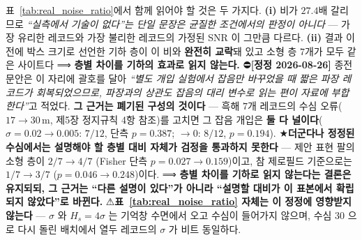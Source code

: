 \documentclass[11pt]{report}
\numberwithin{equation}{chapter}
\numberwithin{figure}{chapter}
\numberwithin{table}{chapter}
\begin{document}
표~\ref{tab:real_noise_ratio}에서 함께 읽어야 할 것은 두 가지다. \textbf{(i)} 비가 $27.4$배
갈리므로 \emph{``실측에서 기술이 없다''는 단일 문장은 균질한 조건에서의 판정이 아니다} ---
가장 유리한 레코드와 가장 불리한 레코드의 가정된 SNR 이 그만큼 다르다. \textbf{(ii)} 결과
이전에 박스 크기로 선언한 기하 층이 이 비와 \textbf{완전히 교락}돼 있고 소형 층 $7$개가
모두 같은 사이트다 ⟹ \textbf{층별 차이를 기하의 효과로 읽지 않는다.}
⛔\textbf{[정정 2026-08-26]} 종전 문안은 이 자리에 괄호를 달아 \emph{``별도 개입 실험에서
잡음만 바꾸었을 때 짧은 파장 레코드가 회복되었으므로, 파장과의 상관도 잡음의 대리
변수로 읽는 편이 자료에 부합한다''}고 적었다. \textbf{그 근거는 폐기된 구성의 것이다} ---
흑해 $7$개 레코드의 수심 오류($17 \to 30$\,m, 제5장 정지규칙 4항 참조)를 고치면
그 잡음 개입은 \textbf{둘 다 널이다}($\sigma = 0.02 \to 0.005$: $7/12$, 단측 $p = 0.387$;
$\to 0$: $8/12$, $p = 0.194$). ★\textbf{더군다나 정정된 수심에서는 설명해야 할 층별 대비
자체가 검정을 통과하지 못한다} --- 제안 표현 팔의 소형 층이 $2/7 \to 4/7$
(Fisher 단측 $p = 0.027 \to 0.159$)이고, 참 제로필드 기준으로는 $1/7 \to 3/7$
($p = 0.046 \to 0.248$)이다. ⟹ \textbf{층별 차이를 기하로 읽지 않는다는 결론은 유지되되,
그 근거는 ``다른 설명이 있다''가 아니라 ``설명할 대비가 이 표본에서 확립되지
않았다''로 바뀐다.} ⚠\textbf{표~\ref{tab:real_noise_ratio} 자체는 이 정정에 영향받지
않는다} --- $\sigma$ 와 $H_s = 4\sigma$ 는 기억창 수면에서 오고 수심이 들어가지 않으며,
수심 $30$ 으로 다시 돌린 배치에서 열두 레코드의 $\sigma$ 가 비트 동일하다.

\end{document}
